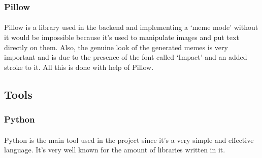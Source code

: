 \documentclass[12pt]{report}
\begin{document}
\subsubsection*{Pillow}
\paragraph{}
Pillow is a library used in the backend and implementing a `meme mode' without it would be impossible because it's used
to manipulate images and put text directly on them. Also, the genuine look of the generated memes is very important and is due
to the presence of the font called `Impact' and an added stroke to it. All this is done with help of Pillow.

\subsection*{Tools}
\subsubsection*{Python}
\paragraph{}
Python is the main tool used in the project since it's a very simple and effective language. It's very well known for
the amount of libraries written in it.




{}

\end{document}

